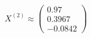 \documentclass[preview]{standalone}
\begin{document}
\begin{align*}
X^{(2)} \approx \begin{pmatrix} 0.97 \\ 0.3967 \\ -0.0842 \end{pmatrix}
\end{align*}
\end{document}
